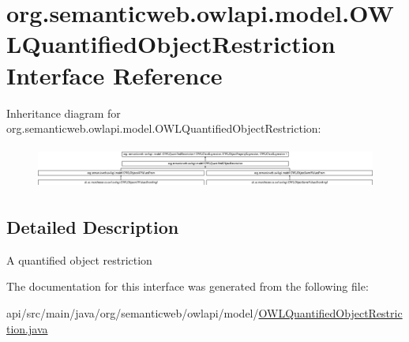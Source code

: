 \hypertarget{interfaceorg_1_1semanticweb_1_1owlapi_1_1model_1_1_o_w_l_quantified_object_restriction}{\section{org.\-semanticweb.\-owlapi.\-model.\-O\-W\-L\-Quantified\-Object\-Restriction Interface Reference}
\label{interfaceorg_1_1semanticweb_1_1owlapi_1_1model_1_1_o_w_l_quantified_object_restriction}
}
Inheritance diagram for org.\-semanticweb.\-owlapi.\-model.\-O\-W\-L\-Quantified\-Object\-Restriction\-:\begin{figure}[H]
\begin{center}
\leavevmode
\includegraphics[height=1.384425cm]{interfaceorg_1_1semanticweb_1_1owlapi_1_1model_1_1_o_w_l_quantified_object_restriction}
\end{center}
\end{figure}


\subsection{Detailed Description}
A quantified object restriction 

The documentation for this interface was generated from the following file\-:\begin{DoxyCompactItemize}
\item 
api/src/main/java/org/semanticweb/owlapi/model/\hyperlink{_o_w_l_quantified_object_restriction_8java}{O\-W\-L\-Quantified\-Object\-Restriction.\-java}\end{DoxyCompactItemize}
